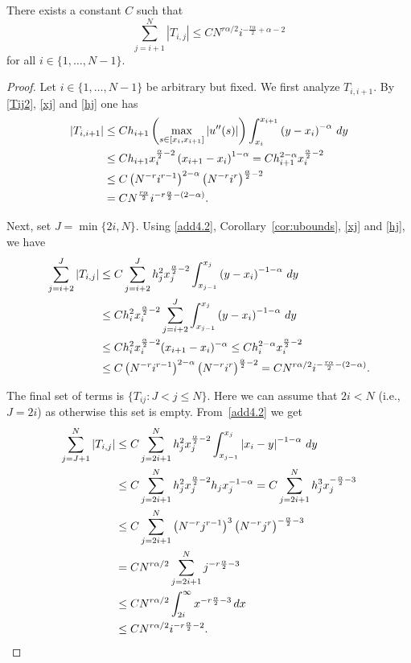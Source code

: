 \documentclass[smallextended]{svjour3}       %
\begin{document}
\begin{lemma}\label{lem4.2imp}
	There exists a constant $C$ such that
	\[
	\sum_{j=i+1}^N |T_{i,j}| \le C N^{r\alpha/2}  i^{-\frac{r\alpha}{2} + \alpha-2}
	\]
	for all $i\in\{1, \dots, N-1\}$.
\end{lemma}
\begin{proof}
	Let $i\in\{1, \dots, N-1\}$ be arbitrary but fixed.
	We first analyze $T_{i,i+1}$. By \eqref{Tij2}, \eqref{xj} and \eqref{hj}  one has
	\begin{align}
		\left|T_{i,i+1} \right|
		& \leq  C h_{i+1}  \left(\max_{s\in[x_{i}, x_{i+1}]} \left| u''(s)\right| \right) \int_{x_{i}}^{x_{i+1}}  \left(y - x_{i}\right)^{-\alpha}   \,dy  \notag\\
		& \leq C h_{i+1} x_{i}^{\frac{\alpha}{2}-2} \left(x_{i+1} - x_{i}\right)^{1-\alpha}  = C h_{i+1}^{2-\alpha} x_{i}^{\frac{\alpha}{2}-2}  \notag\\
		&\le C \left(N^{-r} i^{r-1}\right)^{2-\alpha}  \left(N^{-r} i^r\right)^{\frac{\alpha}{2}-2}  \notag\\
		&= C N^{\frac{r\alpha}{2}}  i^{-r\frac{\alpha}{2}-(2-\alpha)}.  \label{Tii+1}
	\end{align}
	
	Next, set $J = \min\{2i,N\}$. Using \eqref{add4.2}, Corollary~\ref{cor:ubounds}, \eqref{xj} and \eqref{hj}, we have
	\begin{align}
		\sum_{j=i+2}^J |T_{i,j}|
		& \leq C \sum_{j=i+2}^J h_j^2  x_j^{\frac{\alpha}{2}-2} \int_{x_{j-1}}^{x_{j}}  \left(y - x_{i}\right)^{-1-\alpha}  \,dy \notag\\
		& \leq  C h_i^2  x_i^{\frac{\alpha}{2}-2} \sum_{j=i+2}^J \int_{x_{j-1}}^{x_{j}}  \left(y - x_{i}\right)^{-1-\alpha}  \,dy \notag\\
		&\le C h_i^2  x_{i}^{\frac{\alpha}{2}-2} (x_{i+1}-x_i)^{-\alpha}
		\le  C h_i^{2-\alpha}  x_{i}^{\frac{\alpha}{2}-2} \notag\\
		&\le C \left(N^{-r}i^{r-1}\right)^{2-\alpha} \left(N^{-r}i^r\right)^{\frac{\alpha}{2}-2}
		= C  N^{r\alpha/2}  i^{-\frac{r\alpha}{2} -(2-\alpha)}.  \label{TijJ}
	\end{align}
	
	The final set of terms is $\{T_{ij}: J < j\le N\}$. Here we can assume that $2i<N$ (i.e., $J=2i$) as otherwise this set is empty.
	From~\eqref{add4.2} we get
	\begin{align}
		\sum_{j=J+1}^N |T_{i,j}|
		&\le C \sum_{j=2i+1}^N  h_j^2 x_j^{\frac{\alpha}{2}-2} \int_{x_{j-1}}^{x_{j}}  \left| x_{i}-y \right|^{-1-\alpha} \,dy  \notag\\
		&\le C \sum_{j=2i+1}^N  h_j^2 x_j^{\frac{\alpha}{2}-2} h_j x_j^{-1-\alpha}
		= C \sum_{j=2i+1}^N  h_j^3 x_j^{-\frac{\alpha}{2}-3}  \notag\\
		& \leq  C \sum_{j=2i+1}^N   \left(N^{-r} j^{r-1}\right)^3  \left(N^{-r} j^r\right)^{-\frac{\alpha}{2}-3}    \notag\\
		&=  C  N^{r\alpha/2}  \sum_{j=2i+1}^N j^{-r\frac{\alpha}{2}-3}   \notag\\
		&\le C N^{r\alpha/2} \int_{2i}^\infty x^{-r\frac{\alpha}{2}-3}\,dx  \notag\\
		& \leq C  N^{r\alpha/2} i^{-r\frac{\alpha}{2}-2}.  \label{TijJN}
	\end{align}
	

\end{proof}
\end{document}
